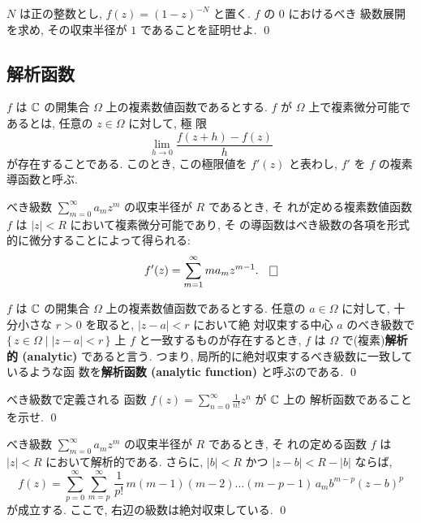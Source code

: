 \documentclass[12pt,twoside]{jarticle}
\begin{document}
\begin{question}
  $N$ は正の整数とし, $f(z)=(1-z)^{-N}$ と置く. $f$ の $0$ におけるべき
  級数展開を求め, その収束半径が $1$ であることを証明せよ. \qed
\end{question}


\subsection{解析函数}

$f$ は ${\mathbb C}$ の開集合 $\Omega$ 上の複素数値函数であるとする. $f$ が 
$\Omega$ 上で複素微分可能であるとは, 任意の $z\in\Omega$ に対して, 極
限
\[
  \lim_{h\to 0} \frac{f(z+h) - f(z)}{h}
\]%
が存在することである. このとき, この極限値を $f'(z)$ と表わし, $f'$ を 
$f$ の複素導函数と呼ぶ.

\begin{question}
  べき級数 $\sum_{m=0}^{\infty} a_m z^m$ の収束半径が $R$ であるとき, そ
  れが定める複素数値函数 $f$ は $|z|<R$ において複素微分可能であり, そ
  の導函数はべき級数の各項を形式的に微分することによって得られる:
  \[
    f'(z) = \sum_{m=1}^{\infty} m a_m z^{m-1}. \qed
  \]%
\end{question}

\begin{definition}[複素解析函数]
$f$ は ${\mathbb C}$ の開集合 $\Omega$ 上の複素数値函数であるとする. 任意の 
$a\in\Omega$ に対して, 十分小さな $r>0$ を取ると, $|z-a|<r$ において絶
対収束する中心 $a$ のべき級数で $\{\,z\in\Omega\mid |z-a|<r\,\}$ 上 $f$ 
と一致するものが存在するとき, $f$ は $\Omega$ で(複素){\bf 解析的 (analytic)}
であると言う. つまり, 局所的に絶対収束するべき級数に一致しているような函
数を{\bf 解析函数 (analytic function)} と呼ぶのである.
\qed
\end{definition}

\begin{question}
  べき級数で定義される
  函数 $f(z) = \sum\limits_{n=0}^\infty \frac{1}{n!} z^n$ が ${\mathbb C}$ 上の
  解析函数であることを示せ. \qed
\end{question}

\begin{question}
  べき級数 $\sum_{m=0}^{\infty} a_m z^m$ の収束半径が $R$ であるとき, そ
  れの定める函数 $f$ は $|z|<R$ において解析的である. さらに, $|b|<R$ 
  かつ $|z-b|<R-|b|$ ならば,
  \[
    f(z)
    = \sum_{p=0}^{\infty} \sum_{m=p}^{\infty}\,
      \frac{1}{p!}\, m(m-1)(m-2)\dots(m-p-1)\, a_m b^{m-p} (z - b)^p
  \]%
  が成立する. ここで, 右辺の級数は絶対収束している. \qed
\end{question}
\end{document}
